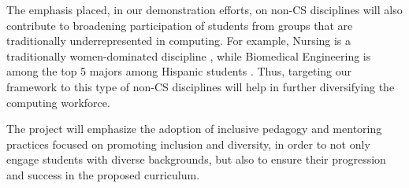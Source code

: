 The emphasis placed, in our demonstration efforts, on non-CS disciplines  will also contribute to broadening participation  of students from groups that are traditionally underrepresented in computing. For example, Nursing is a traditionally women-dominated discipline \cite{nursing}, while Biomedical Engineering is among the top 5 majors among Hispanic students \cite{biomed}. Thus, targeting our framework to this type of non-CS disciplines will help in further diversifying the computing workforce.

The project will emphasize the adoption of inclusive pedagogy and mentoring practices focused on promoting inclusion and diversity, in order to not only engage students with diverse backgrounds, but also to ensure their progression and success in the proposed curriculum.



